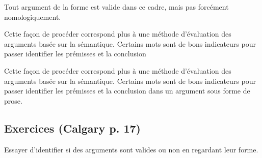 \documentclass[fleqn,a4paper,nobib]{tufte-handout}
\begin{document}
Tout argument de la forme
est valide dans ce cadre, mais pas forcément nomologiquement.

Cette façon de procéder correspond plus à une méthode d'évaluation
des arguments basée sur la sémantique. Certains mots sont de bons
indicateurs pour passer identifier les prémisses et la conclusion

Cette façon de procéder correspond plus à une méthode d'évaluation
des arguments basée sur la sémantique. Certains mots sont de bons
indicateurs pour passer identifier les prémisses et la conclusion
dans un argument sous forme de prose.
\begin{marginfigure}[-5cm]
\end{marginfigure}

\subsection*{Exercices (Calgary p. 17)}

Essayer d'identifier si des arguments sont valides ou non en
regardant leur forme.
\end{document}
